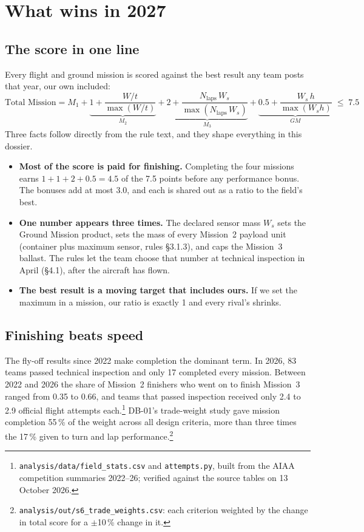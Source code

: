 \section{What wins in 2027}

\subsection{The score in one line}
Every flight and ground mission is scored against the best result any team posts that year, our own included:
\[
  \text{Total Mission} = M_1 + \underbrace{1 + \frac{W/t}{\max(W/t)}}_{M_2}
    + \underbrace{2 + \frac{N_{\text{laps}}\,W_s}{\max(N_{\text{laps}}\,W_s)}}_{M_3}
    + \underbrace{0.5 + \frac{W_s\,h}{\max(W_s h)}}_{GM} \;\le\; 7.5
\]
Three facts follow directly from the rule text, and they shape everything in this dossier.

\begin{itemize}
\item \textbf{Most of the score is paid for finishing.} Completing the four missions earns $1 + 1 + 2 + 0.5 = 4.5$ of the 7.5 points before any performance bonus. The bonuses add at most 3.0, and each is shared out as a ratio to the field's best.
\item \textbf{One number appears three times.} The declared sensor mass $W_s$ sets the Ground Mission product, sets the mass of every Mission~2 payload unit (container plus maximum sensor, rules §3.1.3), and caps the Mission~3 ballast. The rules let the team choose that number at technical inspection in April (§4.1), after the aircraft has flown.
\item \textbf{The best result is a moving target that includes ours.} If we set the maximum in a mission, our ratio is exactly 1 and every rival's shrinks.
\end{itemize}

\subsection{Finishing beats speed}
The fly-off results since 2022 make completion the dominant term. In 2026, 83 teams passed technical inspection and only 17 completed every mission. Between 2022 and 2026 the share of Mission~2 finishers who went on to finish Mission~3 ranged from 0.35 to 0.66, and teams that passed inspection received only 2.4 to 2.9 official flight attempts each.\footnote{\texttt{analysis/data/field\_stats.csv} and \texttt{attempts.py}, built from the AIAA competition summaries 2022--26; verified against the source tables on 13 October 2026.} DB-01's trade-weight study gave mission completion 55\,\% of the weight across all design criteria, more than three times the 17\,\% given to turn and lap performance.\footnote{\texttt{analysis/out/s6\_trade\_weights.csv}: each criterion weighted by the change in total score for a $\pm$10\,\% change in it.}

